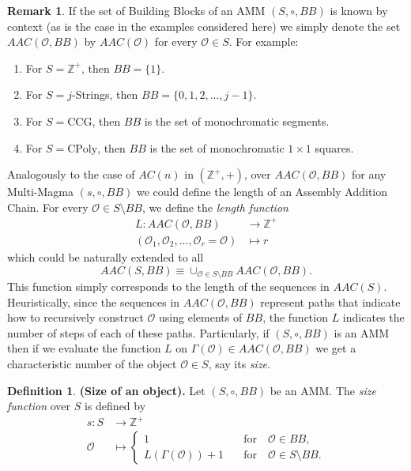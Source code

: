 \documentclass[letterpaper,12pt]{article}
\theoremstyle{definition}
\newtheorem{definition}{Definition}
\newtheorem{remark}{Remark}
\begin{document}
\begin{remark}
If the set of Building Blocks of an AMM $(S,\circ,BB)$ is known by context (as is the case in the examples considered here) we simply denote the set $AAC(\mathscr{O},BB)$ by $AAC(\mathscr{O})$ for every $\mathscr{O} \in S$. For example: 
\begin{enumerate}
    \item For $S=\mathbb{Z}^+$, then $BB=\{1\}$.
    \item For $S=j$-Strings, then $BB=\{0,1,2,...,j-1\}$.
    \item For $S=\text{CCG}$, then $BB$ is the set of monochromatic segments. 
    \item For $S=\text{CPoly}$, then $BB$ is the set of monochromatic $1 \times 1$ squares.
\end{enumerate}
\end{remark}
Analogously to the case of $AC(n)$ in $(\mathbb{Z}^+,+)$, over $AAC(\mathscr{O},BB)$ for any Multi-Magma $(s,\circ,BB)$ we could define the length of an Assembly Addition Chain. For every $\mathscr{O} \in S \setminus BB$, we define the \textit{length function}  
\begin{equation*}
\begin{split}
L: AAC(\mathscr{O},BB) & \to \mathbb{Z}^{+} \\
    (\mathscr{O}_1,\mathscr{O}_2,\dots, \mathscr{O}_r=\mathscr{O}) & \mapsto r
\end{split}
\end{equation*}
which could be naturally extended to all
\begin{equation*}
    AAC(S,BB) \equiv \cup_{\mathscr{O} \in S \setminus BB}AAC(\mathscr{\mathscr{O}},BB).
\end{equation*}
This function simply corresponds to the length of the sequences in $AAC(S)$. Heuristically, since the sequences in $AAC(\mathscr{O},BB)$ represent paths that indicate how to recursively construct $\mathscr{O}$ using elements of $BB$, the function $L$ indicates the number of steps of each of these paths. Particularly, if $(S,\circ,BB)$ is an AMM then if we evaluate the function $L$ on $\Gamma(\mathscr{O}) \in AAC(\mathscr{O},BB)$ we get a characteristic number of the object $\mathscr{O} \in S$, say its \textit{size}.
\begin{definition} \textbf{(Size of an object).} Let $(S,\circ,BB)$ be an AMM. The \textit{size function} over $S$ is defined by 
\begin{equation}\label{sizefun}
\begin{split}
    s: S & \to \mathbb{Z}^+ \\
    \mathscr{O} & \mapsto \begin{cases}
        1 & \quad \text{for} \quad \mathscr{O} \in BB, \\
        L(\Gamma(\mathscr{O}))+1 & \quad \text{for} \quad \mathscr{O} \in S \setminus BB. 
    \end{cases}
\end{split}
\end{equation} 
\end{definition}
\end{document}
